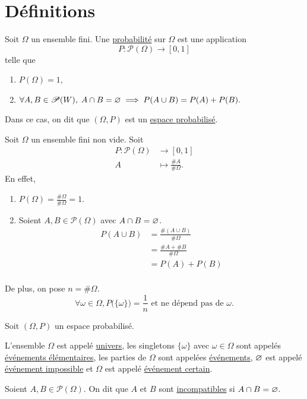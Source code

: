\part{Définitions}

\begin{defn}
	Soit $\Omega$ un ensemble fini. Une \underline{probabilité}  sur $\Omega$ est une application \[
		P : \mathcal{P}(\Omega) \longrightarrow [0, 1]
	\] telle que
	\begin{enumerate}
		\item $P(\Omega) = 1$,
		\item $\forall A,B \in \mathcal{P}(W),\; A\cap B = \varnothing \implies P(A\cup B) = P(A) + P(B).$
	\end{enumerate}
	
	Dans ce cas, on dit que $(\Omega, P)$ est un \underline{espace probabilisé}.
\end{defn}

\begin{exm}[équiprobabilité]
	Soit $\Omega$ un ensemble fini non vide. Soit \begin{align*}
		P: \mathcal{P}(\Omega) &\longrightarrow [0,1] \\
		A &\longmapsto \frac{\#A}{\#\Omega}.
	\end{align*}
	En effet,
	\begin{enumerate}
		\item $P(\Omega) = \frac{\#\Omega}{\#\Omega} = 1$.
		\item Soient $A, B \in \mathcal{P}(\Omega)$ avec $A \cap B = \varnothing$.
			\begin{align*}
				P(A \cup B) &= \frac{\#(A\cup B)}{\#\Omega} \\
				&= \frac{\#A + \#B}{\#\Omega} \\
				&= P(A) + P(B) \\
			\end{align*}
	\end{enumerate}

	De plus, on pose $n = \#\Omega$. \[
		\forall \omega \in \Omega, P\big(\{\omega\}\big) = \frac{1}{n} \text{ et ne dépend pas de } \omega.
	\]
\end{exm}

\begin{defn}
	Soit $(\Omega, P)$ un espace probabilisé.

	L'ensemble $\Omega$ est appelé \underline{univers}, les singletons $\{\omega\}$ avec $\omega \in \Omega$ sont appelés \underline{événements élémentaires}, les parties de $\Omega$ sont appelées \underline{événements}, $\varnothing$ est appelé \underline{événement impossible} et $\Omega$ est appelé \underline{événement certain}.

	Soient $A,B \in \mathcal{P}(\Omega)$. On dit que $A$ et $B$ sont \underline{incompatibles} si $A \cap B = \varnothing$.
\end{defn}

